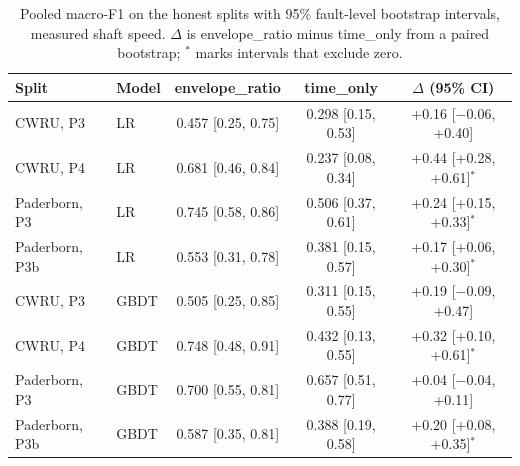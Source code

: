 \begin{table}[t]
\caption{Pooled macro-F1 on the honest splits with 95\% fault-level bootstrap intervals, measured shaft speed. $\Delta$ is envelope\_ratio minus time\_only from a paired bootstrap; $^{*}$ marks intervals that exclude zero.}
\label{tab:headline}
\centering
\begin{tabular}{llccc}
\hline
Split & Model & envelope\_ratio & time\_only & $\Delta$ (95\% CI) \\
\hline
CWRU, P3 & LR & 0.457 [0.25, 0.75] & 0.298 [0.15, 0.53] & +0.16 [$-$0.06, +0.40] \\
CWRU, P4 & LR & 0.681 [0.46, 0.84] & 0.237 [0.08, 0.34] & +0.44 [+0.28, +0.61]$^{*}$ \\
Paderborn, P3 & LR & 0.745 [0.58, 0.86] & 0.506 [0.37, 0.61] & +0.24 [+0.15, +0.33]$^{*}$ \\
Paderborn, P3b & LR & 0.553 [0.31, 0.78] & 0.381 [0.15, 0.57] & +0.17 [+0.06, +0.30]$^{*}$ \\
CWRU, P3 & GBDT & 0.505 [0.25, 0.85] & 0.311 [0.15, 0.55] & +0.19 [$-$0.09, +0.47] \\
CWRU, P4 & GBDT & 0.748 [0.48, 0.91] & 0.432 [0.13, 0.55] & +0.32 [+0.10, +0.61]$^{*}$ \\
Paderborn, P3 & GBDT & 0.700 [0.55, 0.81] & 0.657 [0.51, 0.77] & +0.04 [$-$0.04, +0.11] \\
Paderborn, P3b & GBDT & 0.587 [0.35, 0.81] & 0.388 [0.19, 0.58] & +0.20 [+0.08, +0.35]$^{*}$ \\
\hline
\end{tabular}
\end{table}
